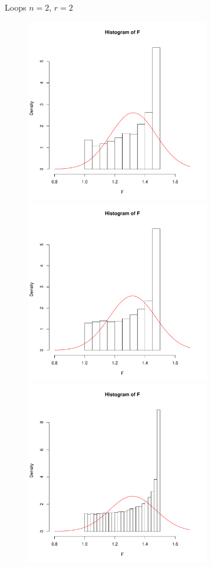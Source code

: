 \documentclass{beamer}
\begin{document}
\begin{frame}{Loops}
$n=2$, $r=2$\\
\begin{figure}

\begin{overprint}
\centerline{\includegraphics[width=8cm]{Primer_1e+3.pdf}}
\centerline{\includegraphics[width=8cm]{Primer_1e+4.pdf}}
\centerline{\includegraphics[width=8cm]{Primer_1e+5.pdf}}

\end{overprint}
\end{figure}
\end{frame}
\end{document}
